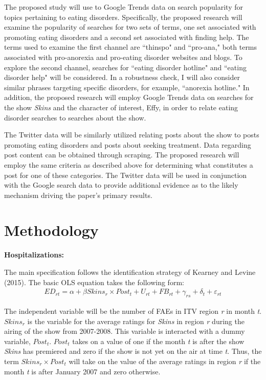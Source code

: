 \documentclass[12pt]{article}
\begin{document}
The proposed study will use to Google Trends data on search popularity for topics pertaining to eating disorders. Specifically, the proposed research will examine the popularity of searches for two sets of terms, one set associated with promoting eating disorders and a second set associated with finding help. The terms used to examine the first channel are ``thinspo" and ``pro-ana," both terms associated with pro-anorexia and pro-eating disorder websites and blogs. To explore the second channel, searches for ``eating disorder hotline" and ``eating disorder help" will be considered. In a robustness check, I will also consider similar phrases targeting specific disorders, for example, ``anorexia hotline." In addition, the proposed research will employ Google Trends data on searches for the show \textit{Skins} and the character of interest, Effy, in order to relate eating disorder searches to searches about the show.

The Twitter data will be similarly utilized relating posts about the show to posts promoting eating disorders and posts about seeking treatment. Data regarding post content can be obtained through scraping. The proposed research will employ the same criteria as described above for determining what constitutes a post for one of these categories. The Twitter data will be used in conjunction with the Google search data to provide additional evidence as to the likely mechanism driving the paper's primary results.

\section{Methodology}

{\bf Hospitalizations:}

The main specification follows the identification strategy of Kearney and Levine (2015). The basic OLS equation takes the following form:
\begin{eqnarray*}	
	ED_{rt} = \alpha + \beta Skins_{r} \times Post_{t} + U_{rt} + FB_{rt} + \gamma_{rs} + \delta_t + \varepsilon_{rt}	
\end{eqnarray*}

The independent variable will be the number of FAEs in ITV region \textit{r} in month \textit{t}. $Skins_{r}$ is the variable for the average ratings for \textit{Skins} in region \textit{r} during the airing of the show from 2007-2008. This variable is interacted with a dummy variable, $Post_t$. $Post_t$ takes on a value of one if the month \textit{t} is after the show \textit{Skins} has premiered and zero if the show is not yet on the air at time \textit{t}. Thus, the term $Skins_{r} \times Post_{t}$ will take on the value of the average ratings in region \textit{r} if the month \textit{t} is after January 2007 and zero otherwise.
\end{document}
